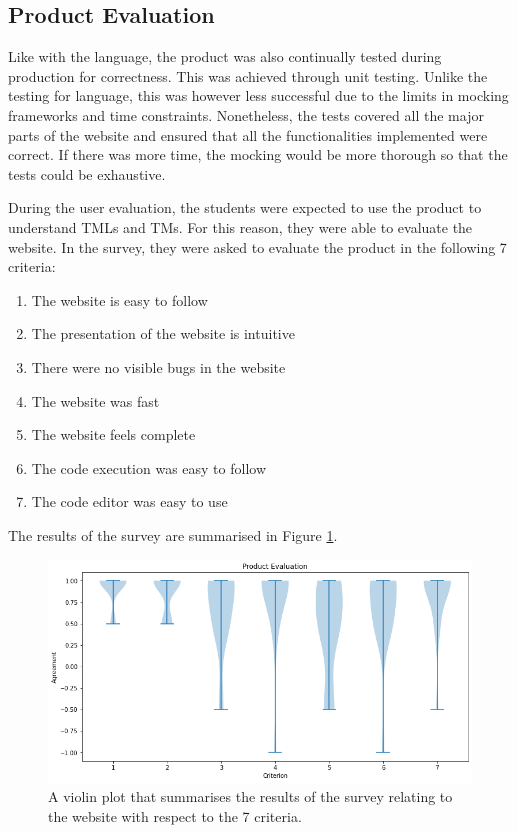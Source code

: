 \subsection{Product Evaluation}
Like with the language, the product was also continually tested during production for correctness. This was achieved through unit testing. Unlike the testing for language, this was however less successful due to the limits in mocking frameworks and time constraints. Nonetheless, the tests covered all the major parts of the website and ensured that all the functionalities implemented were correct. If there was more time, the mocking would be more thorough so that the tests could be exhaustive.


During the user evaluation, the students were expected to use the product to understand TMLs and TMs. For this reason, they were able to evaluate the website. In the survey, they were asked to evaluate the product in the following 7 criteria:
\begin{enumerate}
    \item The website is easy to follow
    \item The presentation of the website is intuitive
    \item There were no visible bugs in the website
    \item The website was fast
    \item The website feels complete
    \item The code execution was easy to follow
    \item The code editor was easy to use
\end{enumerate}
The results of the survey are summarised in Figure \ref{fig:website-evaluation}. 

\begin{figure}[htb]
    \centering
    \includegraphics[scale=0.35]{data/website-evaluation.png}
    \caption{A violin plot that summarises the results of the survey relating to the website with respect to the 7 criteria.}
    \label{fig:website-evaluation}
\end{figure}

